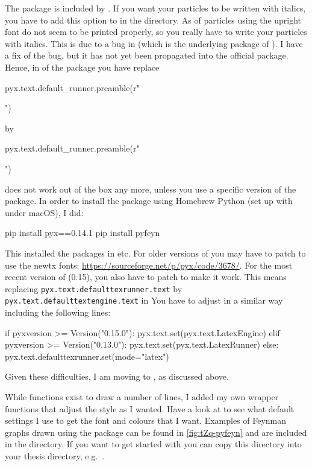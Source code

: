 The package  is included by .
If you want your particles to be written with italics,
you have to add this option to  in the  directory.
As of  particles using the upright font do not seem to be printed properly,
so you really have to write your particles with italics.
This is due to a bug in  (which is the underlying package of ).
I have a fix of the bug, but it has not yet been propagated into the official package.
Hence, in  of the package you have replace
\begin{bashlisting}
pyx.text.default_runner.preamble(r"\usepackage{hepnicenames}")
\end{bashlisting}
by
\begin{bashlisting}
pyx.text.default_runner.preamble(r"\usepackage[italic]{hepnicenames}")
\end{bashlisting}

 does not work out of the box any more,
unless you use a specific version of the  package.
In order to install the package using Homebrew Python (set up with  under macOS), I did:
\begin{bashlisting}
pip install pyx==0.14.1
pip install pyfeyn
\end{bashlisting}
This installed the packages in  etc.
For older versions of  you may have to patch 
to use the newtx fonts: \url{https://sourceforge.net/p/pyx/code/3678/}.
For the most recent version of  (0.15), you also have to patch  to make it work.
This means replacing
\verb+pyx.text.defaulttexrunner.text+ by
\verb+pyx.text.defaulttextengine.text+
in 
You have to adjust  in a similar way including the following lines:
\begin{bashlisting}
if pyxversion >= Version("0.15.0"):
    pyx.text.set(pyx.text.LatexEngine)
elif pyxversion >= Version("0.13.0"):
    pyx.text.set(pyx.text.LatexRunner)
else:
    pyx.text.defaulttexrunner.set(mode="latex")
\end{bashlisting}

Given these difficulties, I am moving to ,
as discussed above.

While functions exist to draw a number of lines, I added my own wrapper functions
that adjust the style as I wanted.
Have a look at  to see what default settings I use
to get the font and colours that I want.
Examples of Feynman graphs drawn using the package can be found in
\cref{fig:tZq-pyfeyn} and are included in the  directory.
If you want to get started with  you can copy this directory
into your thesis directory, e.g.\ .

